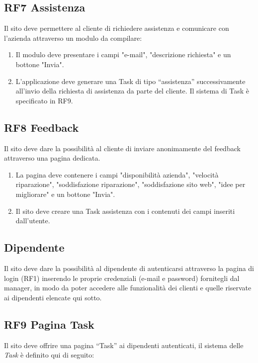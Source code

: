 \documentclass{report}
\begin{document}
\subsection*{RF7 Assistenza}
Il sito deve permettere al cliente di richiedere assistenza e comunicare con l'azienda attraverso un modulo da compilare:

\begin{enumerate}
	\item Il modulo deve presentare i campi "e-mail", "descrizione richiesta" e un bottone "Invia".
	
	\item L’applicazione deve generare una Task di tipo “assistenza” successivamente all’invio della richiesta di assistenza da parte del cliente. Il sistema di Task è specificato in RF9.
	
	
\end{enumerate}

\subsection*{RF8 Feedback}
Il sito deve dare la possibilità al cliente di inviare anonimamente del feedback attraverso una pagina dedicata.
\begin{enumerate}
	\item La pagina deve contenere i campi "disponibilità azienda", "velocità riparazione", "soddisfazione riparazione", "soddisfazione sito web", "idee per migliorare" e un bottone "Invia".

	\item Il sito deve creare una Task assistenza con i contenuti dei campi inseriti dall'utente.

	
\end{enumerate}

\subsection{Dipendente}
Il sito deve dare la possibilità al dipendente di autenticarsi attraverso la pagina di login (RF1) inserendo le proprie credenziali (e-mail e password) fornitegli dal manager, in modo da poter accedere alle funzionalità dei clienti  e quelle riservate ai dipendenti elencate qui sotto.

\subsection*{RF9 Pagina Task}

Il sito deve offrire una pagina “Task” ai dipendenti autenticati, il sistema delle \textit{Task} è definito qui di seguito:
\end{document}
